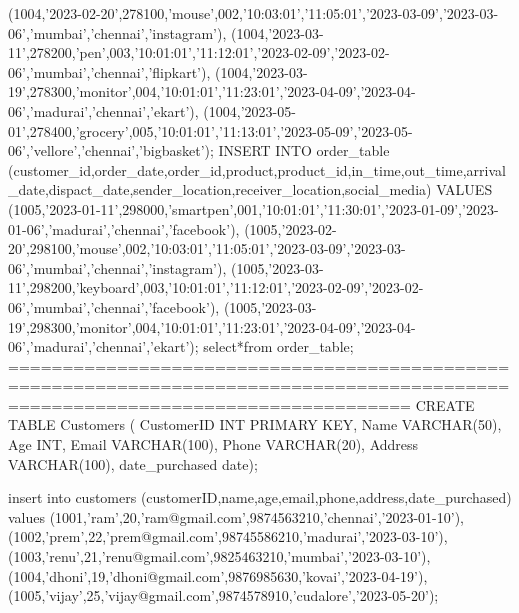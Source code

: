 (1004,'2023-02-20',278100,'mouse',002,'10:03:01','11:05:01','2023-03-09','2023-03-06','mumbai','chennai','instagram'),
(1004,'2023-03-11',278200,'pen',003,'10:01:01','11:12:01','2023-02-09','2023-02-06','mumbai','chennai','flipkart'),
(1004,'2023-03-19',278300,'monitor',004,'10:01:01','11:23:01','2023-04-09','2023-04-06','madurai','chennai','ekart'),
(1004,'2023-05-01',278400,'grocery',005,'10:01:01','11:13:01','2023-05-09','2023-05-06','vellore','chennai','bigbasket');
INSERT INTO order_table
(customer_id,order_date,order_id,product,product_id,in_time,out_time,arrival_date,dispact_date,sender_location,receiver_location,social_media) VALUES
(1005,'2023-01-11',298000,'smartpen',001,'10:01:01','11:30:01','2023-01-09','2023-01-06','madurai','chennai','facebook'),
(1005,'2023-02-20',298100,'mouse',002,'10:03:01','11:05:01','2023-03-09','2023-03-06','mumbai','chennai','instagram'),
(1005,'2023-03-11',298200,'keyboard',003,'10:01:01','11:12:01','2023-02-09','2023-02-06','mumbai','chennai','facebook'),
(1005,'2023-03-19',298300,'monitor',004,'10:01:01','11:23:01','2023-04-09','2023-04-06','madurai','chennai','ekart');
select*from order_table;
=================================================================================================================================
CREATE TABLE Customers (
    CustomerID INT PRIMARY KEY,
    Name VARCHAR(50),
    Age INT,
    Email VARCHAR(100),
    Phone VARCHAR(20),
    Address VARCHAR(100),
    date_purchased date);
    
    insert into customers (customerID,name,age,email,phone,address,date_purchased) values
    (1001,'ram',20,'ram@gmail.com',9874563210,'chennai','2023-01-10'),
    (1002,'prem',22,'prem@gmail.com',98745586210,'madurai','2023-03-10'),
    (1003,'renu',21,'renu@gmail.com',9825463210,'mumbai','2023-03-10'),
    (1004,'dhoni',19,'dhoni@gmail.com',9876985630,'kovai','2023-04-19'),
    (1005,'vijay',25,'vijay@gmail.com',9874578910,'cudalore','2023-05-20');
	
